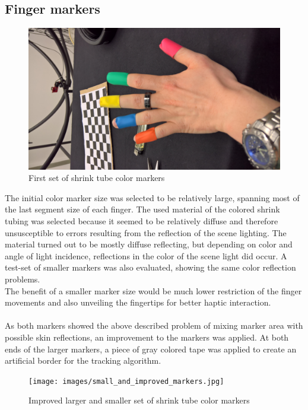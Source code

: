 \subsection{Finger markers}
\begin{figure} 
\centering
\includegraphics[width=\textwidth/2,angle=-90]{images/color_markers_hand.jpg}
\caption{First set of shrink tube color markers }
\label{img:first_set_color_markers}
\end{figure}
The initial color marker size was selected to be relatively large, spanning most of the last segment size of each finger.
The used material of the colored shrink tubing was selected because it seemed to be relatively diffuse and therefore unsusceptible to errors resulting from the reflection of the scene lighting. The material turned out to be mostly diffuse reflecting, but depending on color and angle of light incidence, reflections in the color of the scene light did occur. A test-set of smaller markers was also evaluated, showing the same color reflection problems.\\The benefit of a smaller marker size would be much lower restriction of the finger movements and also unveiling the fingertips for better haptic interaction.
\\\\As both markers showed the above described problem of mixing marker area with possible skin reflections, an improvement to the markers was applied. At both ends of the larger markers, a piece of gray colored tape was applied to create an artificial border for the tracking algorithm.
\begin{figure}[H]
\centering
\texttt{[image: images/small\_and\_improved\_markers.jpg]}
\caption{Improved larger and smaller set of shrink tube color markers }
\label{img:second_color_markers}
\end{figure}
